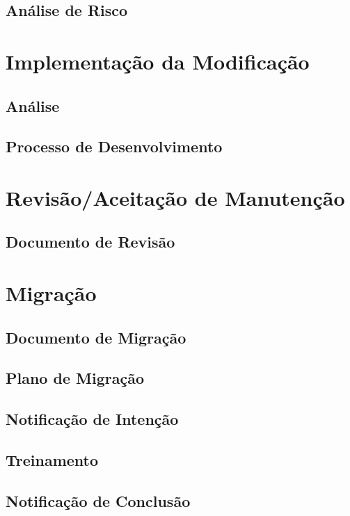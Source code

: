 \documentclass{article}
\begin{document}
	\subsection{Análise de Risco}
	
\section{Implementação da Modificação}

	\subsection{Análise}
	
	\subsection{Processo de Desenvolvimento}
	
\section{Revisão/Aceitação de Manutenção}

	\subsection{Documento de Revisão}

\section{Migração}
	
	\subsection{Documento de Migração}
	
	\subsection{Plano de Migração}

	\subsection{Notificação de Intenção}
	
	\subsection{Treinamento}
	
	\subsection{Notificação de Conclusão}
	
\end{document}
